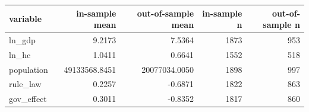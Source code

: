 \begin{tabular}{lrrrr}
\hline
variable & in-sample mean & out-of-sample mean & in-sample n & out-of-sample n \\
\hline
ln\_gdp & 9.2173 & 7.5364 & 1873 & 953 \\
ln\_hc & 1.0411 & 0.6641 & 1552 & 518 \\
population & 49133568.8451 & 20077034.0050 & 1898 & 997 \\
rule\_law & 0.2257 & -0.6871 & 1822 & 863 \\
gov\_effect & 0.3011 & -0.8352 & 1817 & 860 \\
\hline
\end{tabular}
